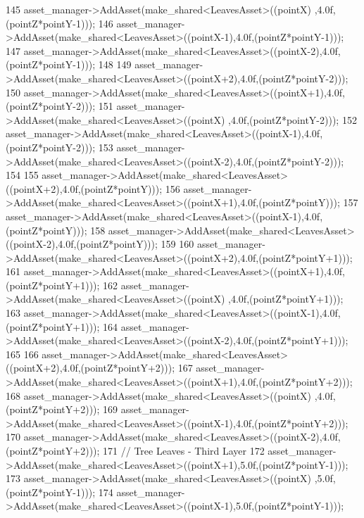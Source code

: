 \begin{DoxyCode}
145             asset\_manager->AddAsset(make\_shared<LeavesAsset>((pointX)  ,4.0f,(pointZ*pointY-1)));
146             asset\_manager->AddAsset(make\_shared<LeavesAsset>((pointX-1),4.0f,(pointZ*pointY-1)));
147             asset\_manager->AddAsset(make\_shared<LeavesAsset>((pointX-2),4.0f,(pointZ*pointY-1)));
148  
149             asset\_manager->AddAsset(make\_shared<LeavesAsset>((pointX+2),4.0f,(pointZ*pointY-2)));
150             asset\_manager->AddAsset(make\_shared<LeavesAsset>((pointX+1),4.0f,(pointZ*pointY-2)));
151             asset\_manager->AddAsset(make\_shared<LeavesAsset>((pointX)  ,4.0f,(pointZ*pointY-2)));
152             asset\_manager->AddAsset(make\_shared<LeavesAsset>((pointX-1),4.0f,(pointZ*pointY-2)));
153             asset\_manager->AddAsset(make\_shared<LeavesAsset>((pointX-2),4.0f,(pointZ*pointY-2)));
154  
155             asset\_manager->AddAsset(make\_shared<LeavesAsset>((pointX+2),4.0f,(pointZ*pointY)));
156             asset\_manager->AddAsset(make\_shared<LeavesAsset>((pointX+1),4.0f,(pointZ*pointY)));
157             asset\_manager->AddAsset(make\_shared<LeavesAsset>((pointX-1),4.0f,(pointZ*pointY)));
158             asset\_manager->AddAsset(make\_shared<LeavesAsset>((pointX-2),4.0f,(pointZ*pointY)));
159  
160             asset\_manager->AddAsset(make\_shared<LeavesAsset>((pointX+2),4.0f,(pointZ*pointY+1)));
161             asset\_manager->AddAsset(make\_shared<LeavesAsset>((pointX+1),4.0f,(pointZ*pointY+1)));
162             asset\_manager->AddAsset(make\_shared<LeavesAsset>((pointX)  ,4.0f,(pointZ*pointY+1)));
163             asset\_manager->AddAsset(make\_shared<LeavesAsset>((pointX-1),4.0f,(pointZ*pointY+1)));
164             asset\_manager->AddAsset(make\_shared<LeavesAsset>((pointX-2),4.0f,(pointZ*pointY+1)));
165 
166             asset\_manager->AddAsset(make\_shared<LeavesAsset>((pointX+2),4.0f,(pointZ*pointY+2)));
167             asset\_manager->AddAsset(make\_shared<LeavesAsset>((pointX+1),4.0f,(pointZ*pointY+2)));
168             asset\_manager->AddAsset(make\_shared<LeavesAsset>((pointX)  ,4.0f,(pointZ*pointY+2)));
169             asset\_manager->AddAsset(make\_shared<LeavesAsset>((pointX-1),4.0f,(pointZ*pointY+2)));
170             asset\_manager->AddAsset(make\_shared<LeavesAsset>((pointX-2),4.0f,(pointZ*pointY+2)));
171             \textcolor{comment}{// Tree Leaves - Third Layer}
172             asset\_manager->AddAsset(make\_shared<LeavesAsset>((pointX+1),5.0f,(pointZ*pointY-1)));
173             asset\_manager->AddAsset(make\_shared<LeavesAsset>((pointX)  ,5.0f,(pointZ*pointY-1)));
174             asset\_manager->AddAsset(make\_shared<LeavesAsset>((pointX-1),5.0f,(pointZ*pointY-1))); 

\end{DoxyCode}
